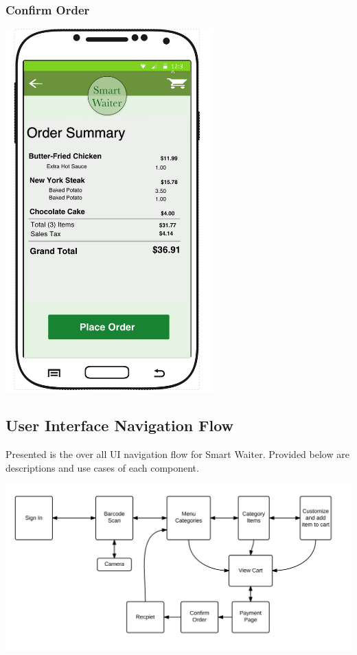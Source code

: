 \documentclass[12pt, titlepage]{article}
\begin{document}
\subsubsection{Confirm Order}
\includegraphics[width=80mm,scale=0.5]{OrderSummary.png}

\subsection{User Interface Navigation Flow}
Presented is the over all UI navigation flow for Smart Waiter. Provided below are descriptions and use cases of each component. 

\includegraphics[width=180mm,scale=0.5]{UIProcess.png}
\end{document}
